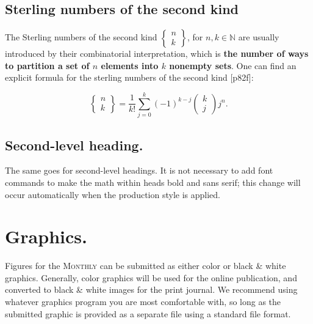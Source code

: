 \documentclass{article}
\theoremstyle{theorem}
\theoremstyle{definition}
\begin{document}
\subsection*{Sterling numbers of the second kind}
 
The Sterling numbers of the second kind \(\left\{ \begin{matrix} n\\k\end{matrix}\right\}\), for \(n,k\in\mathbb{N}\) are usually introduced by their combinatorial interpretation, which is \textbf{the number of ways to partition a set of \(n\) elements into \(k\)
nonempty sets}. One can find an explicit formula for the sterling numbers of the second kind \cite{stanley2011enumerative}[p82f]:

\begin{equation}
\left\{\begin{matrix}n\\k\end{matrix}\right\} = \frac{1}{k!} \sum_{j=0}^k (-1)^{k-j} \begin{pmatrix}k\\j\end{pmatrix}j^n.
\end{equation}


\subsection*{Second-level heading.}

The same goes for second-level headings.  It is not necessary to add font commands to make the math within heads bold and sans serif; this change will occur automatically when the production style is applied.

\section*{Graphics.}

Figures for the \textsc{Monthly} can be submitted as either color or black \& white graphics.  Generally, color graphics will be used for the online publication, and converted to black \& white images for the print journal.  We recommend using whatever graphics program you are most comfortable with, so long as the submitted graphic is provided as a separate file using a standard file format.
\end{document}
